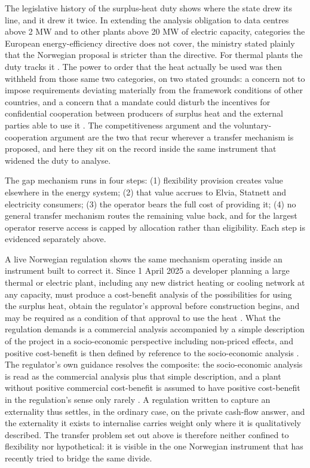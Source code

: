 The legislative history of the surplus-heat duty shows where the state drew its line, and it drew it twice. In extending the analysis obligation to data centres above 2 MW and to other plants above 20 MW of electric capacity, categories the European energy-efficiency directive does not cover, the ministry stated plainly that the Norwegian proposal is stricter than the directive. For thermal plants the duty tracks it \cite{energidepartementet_prop_2023}. The power to order that the heat actually be used was then withheld from those same two categories, on two stated grounds: a concern not to impose requirements deviating materially from the framework conditions of other countries, and a concern that a mandate could disturb the incentives for confidential cooperation between producers of surplus heat and the external parties able to use it \cite{energidepartementet_prop_2023}. The competitiveness argument and the voluntary-cooperation argument are the two that recur wherever a transfer mechanism is proposed, and here they sit on the record inside the same instrument that widened the duty to analyse.

\newpage
\begin{keypoint}
The gap mechanism runs in four steps: (1) flexibility provision creates value elsewhere in the energy system; (2) that value accrues to Elvia, Statnett and electricity consumers; (3) the operator bears the full cost of providing it; (4) no general transfer mechanism routes the remaining value back, and for the largest operator reserve access is capped by allocation rather than eligibility. Each step is evidenced separately above.
\end{keypoint}

A live Norwegian regulation shows the same mechanism operating inside an instrument built to correct it. Since 1 April 2025 a developer planning a large thermal or electric plant, including any new district heating or cooling network at any capacity, must produce a cost-benefit analysis of the possibilities for using the surplus heat, obtain the regulator's approval before construction begins, and may be required as a condition of that approval to use the heat \cite{stortinget_forskrift_2025}. What the regulation demands is a commercial analysis accompanied by a simple description of the project in a socio-economic perspective including non-priced effects, and positive cost-benefit is then defined by reference to the socio-economic analysis \cite{stortinget_forskrift_2025}. The regulator's own guidance resolves the composite: the socio-economic analysis is read as the commercial analysis plus that simple description, and a plant without positive commercial cost-benefit is assumed to have positive cost-benefit in the regulation's sense only rarely \cite{formal_kost-nytteanalyse_2025}. A regulation written to capture an externality thus settles, in the ordinary case, on the private cash-flow answer, and the externality it exists to internalise carries weight only where it is qualitatively described. The transfer problem set out above is therefore neither confined to flexibility nor hypothetical: it is visible in the one Norwegian instrument that has recently tried to bridge the same divide.  

